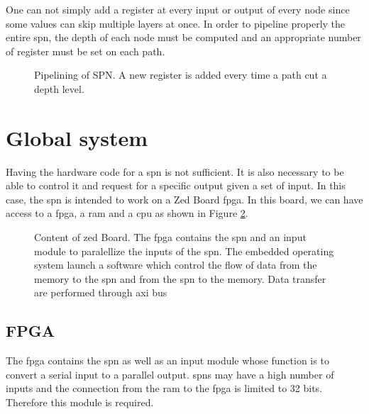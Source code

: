One can not simply add a register at every input or output of every node since some values can skip multiple layers at once. In order to pipeline properly the entire \gls{spn}, the depth of each node must be computed and an appropriate number of register must be set on each path.

\begin{figure}[!ht]
\begin{mdframed}
	\centering
	
	\caption{Pipelining of SPN. A new register is added every time a path cut a depth level.}
	\label{fig:pip}
\end{mdframed}
\end{figure}

\section{Global system}
Having the hardware code for a \gls{spn} is not sufficient. It is also necessary to be able to control it and request for a specific output given a set of input. In this case, the \gls{spn} is intended to work on a Zed Board \gls{fpga}. In this board, we can have access to a \gls{fpga}, a \gls{ram} and a \gls{cpu} as shown in Figure \ref{fig:glob_workflow}.

\begin{figure}[!ht]
\begin{mdframed}
	\centering
	
	\caption{Content of zed Board. The \gls{fpga} contains the \gls{spn} and an input module to paralellize the inputs of the \gls{spn}. The embedded operating system launch a software which control the flow of data from the memory to the \gls{spn} and from the \gls{spn} to the memory. Data transfer are performed through \gls{axi} bus}
	\label{fig:glob_workflow}
\end{mdframed}
\end{figure}

\subsection{FPGA}
The \gls{fpga} contains the \gls{spn} as well as an input module whose function is to convert a serial input to a parallel output. \Glspl{spn} may have a high number of inputs and the connection from the \gls{ram} to the \gls{fpga} is limited to 32 bits. Therefore this module is required.


